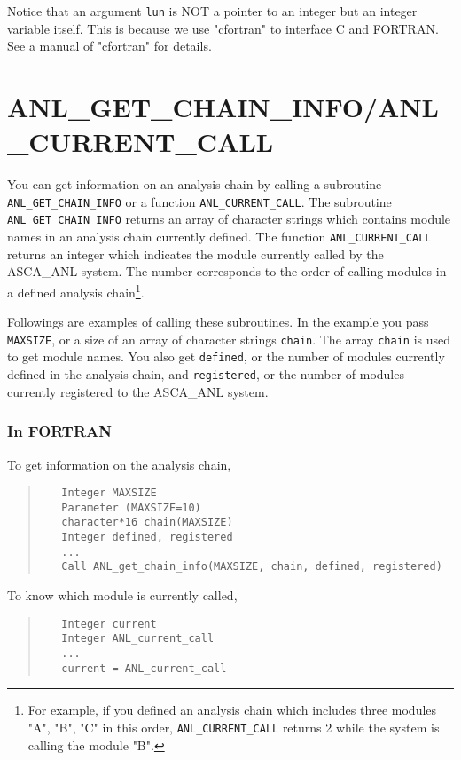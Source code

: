 Notice that
an argument {\tt lun} is NOT a pointer to an integer
but an integer variable itself.
This is
because we use "cfortran" to interface C and FORTRAN.
See a manual of "cfortran"\cite{cfortran} for details.

\section{ANL\_GET\_CHAIN\_INFO/ANL\_CURRENT\_CALL}\label{sec:ANL_get_chain_info}
You can get information on an analysis chain
by calling a subroutine {\tt ANL\_GET\_CHAIN\_INFO}
or a function {\tt ANL\_CURRENT\_CALL}.
The subroutine {\tt ANL\_GET\_CHAIN\_INFO}
returns an array of character strings
which contains module names in an analysis chain currently defined.
The function {\tt ANL\_CURRENT\_CALL}
returns an integer
which indicates the module currently called by the ASCA\_ANL system.
The number corresponds to the order of calling modules
in a defined analysis chain\footnote{
For example,
if you defined an analysis chain
which includes three modules "A", "B", "C" in this order,
{\tt ANL\_CURRENT\_CALL} returns 2
while the system is calling the module "B".
}.

Followings are examples of calling these subroutines.
In the example
you pass {\tt MAXSIZE},
or a size of an array of character strings {\tt chain}.
The array {\tt chain} is used to get module names.
You also get {\tt defined},
or the number of modules currently defined in the analysis chain,
and {\tt registered},
or the number of modules currently registered to the ASCA\_ANL system.

\subsubsection{In FORTRAN}
To get information on the analysis chain,
\begin{quote}\baselineskip 3.2mm\begin{verbatim}
   Integer MAXSIZE
   Parameter (MAXSIZE=10)
   character*16 chain(MAXSIZE)
   Integer defined, registered
   ...
   Call ANL_get_chain_info(MAXSIZE, chain, defined, registered)
\end{verbatim}\end{quote}

To know which module is currently called,
\begin{quote}\baselineskip 3.2mm\begin{verbatim}
   Integer current
   Integer ANL_current_call
   ...
   current = ANL_current_call
\end{verbatim}\end{quote}

